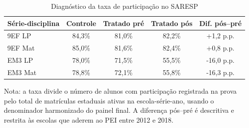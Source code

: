 \begin{table}[htbp]
\centering
\caption{Diagnóstico da taxa de participação no SARESP}
\label{tab:participacao_saresp}
\small
\begin{tabular}{lcccc}
\toprule
Série-disciplina & Controle & Tratado pré & Tratado pós & Dif. pós--pré \\
\midrule
9EF LP & 84,3\% & 81,0\% & 82,2\% & +1,2 p.p. \\
9EF Mat & 85,0\% & 81,6\% & 82,4\% & +0,8 p.p. \\
EM3 LP & 78,0\% & 71,5\% & 55,5\% & -16,0 p.p. \\
EM3 Mat & 78,8\% & 72,1\% & 55,8\% & -16,3 p.p. \\
\bottomrule
\end{tabular}
\vspace{0.2cm}
\begin{flushleft}
\footnotesize Nota: a taxa divide o número de alunos com participação registrada na prova pelo total de matrículas estaduais ativas na escola-série-ano, usando o denominador harmonizado do painel final. A diferença pós--pré é descritiva e restrita às escolas que aderem ao PEI entre 2012 e 2018.
\end{flushleft}
\end{table}
